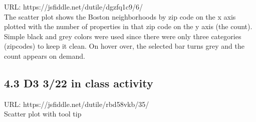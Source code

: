 \documentclass{neu_handout}
\begin{document}
URL: https://jsfiddle.net/dutile/dgzfq1c9/6/ \\

The scatter plot shows the Boston neighborhoods by zip code on the x axis plotted with the number of properties in that zip code on the y axis (the count). Simple black and grey colors were used since there were only three categories (zipcodes) to keep it clean. On hover over, the selected bar turns grey and the count appears on demand.

\subsection*{4.3 D3 3/22 in class activity}

URL: https://jsfiddle.net/dutile/rbd58vkb/35/ \\

Scatter plot with tool tip
\end{document}
